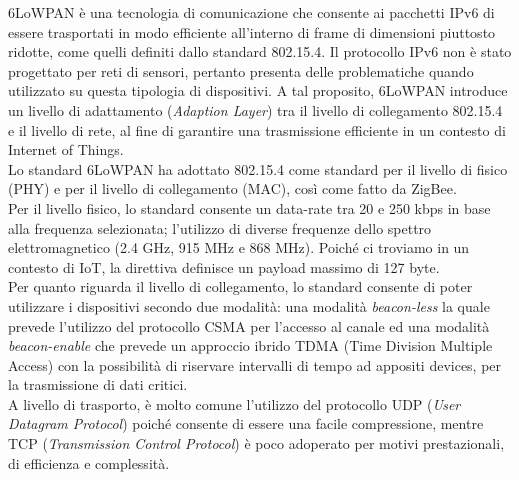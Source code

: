 \noindent 6LoWPAN è una tecnologia di comunicazione che consente ai pacchetti IPv6 di essere trasportati in modo efficiente all'interno di frame di dimensioni piuttosto ridotte, come quelli definiti dallo standard 802.15.4.
Il protocollo IPv6 non è stato progettato per reti di sensori, pertanto presenta delle problematiche quando utilizzato su questa tipologia di dispositivi. A tal proposito, 6LoWPAN introduce un livello di adattamento (\textit{Adaption Layer}) tra il livello di collegamento 802.15.4 e il livello di rete, al fine di garantire una trasmissione efficiente in un contesto di Internet of Things.\\
Lo standard 6LoWPAN ha adottato 802.15.4 come standard per il livello di fisico (PHY) e per il livello di collegamento (MAC), così come fatto da ZigBee.\\
Per il livello fisico, lo standard consente un data-rate tra 20 e 250 kbps in base alla frequenza selezionata; l'utilizzo di diverse frequenze dello spettro elettromagnetico (2.4 GHz, 915 MHz e 868 MHz). Poiché ci troviamo in un contesto di IoT, la direttiva definisce un payload massimo di 127 byte.\\
Per quanto riguarda il livello di collegamento, lo standard consente di poter utilizzare i dispositivi secondo due modalità: una modalità \textit{beacon-less} la quale prevede l'utilizzo del protocollo CSMA per l'accesso al canale ed una modalità \textit{beacon-enable} che prevede un approccio ibrido TDMA (Time Division Multiple Access) con la possibilità di riservare intervalli di tempo ad appositi devices, per la trasmissione di dati critici.\\
A livello di trasporto, è molto comune l'utilizzo del protocollo UDP (\textit{User Datagram Protocol}) poiché consente di essere una facile compressione, mentre TCP (\textit{Transmission Control Protocol}) è poco adoperato per motivi prestazionali, di efficienza e complessità.

